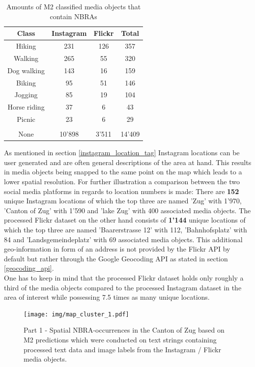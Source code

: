 \begin{table}[h!]
\begin{center}
\caption{Amounts of M2 classified media objects that contain NBRAs}\vspace{1ex}
\label{tab:amount_class_NBRAs}
\begin{tabular}{cccc}\hline
Class & Instagram & Flickr & Total\\ \hline
Hiking & 231 & 126 & 357\\
Walking & 265 & 55 & 320\\
Dog walking & 143 & 16 & 159\\
Biking & 95 & 51 & 146\\
Jogging & 85 & 19 & 104\\
Horse riding & 37 & 6 & 43\\
Picnic & 23 & 6 & 29\\
 & & & \\
None & 10'898 & 3'511 & 14'409\\
\hline
\end{tabular}
\end{center}
\end{table}

As mentioned in section \ref{instagram_location_tag} Instagram locations can be user generated and are often general descriptions of the area at hand. This results in media objects being snapped to the same point on the map which leads to a lower spatial resolution. For further illustration a comparison between the two social media platforms in regards to location numbers is made:
There are \textbf{152} unique Instagram locations of which the top three are named 'Zug' with 1'970, 'Canton of Zug' with 1'590 and 'lake Zug' with 400 associated media objects.
The processed Flickr dataset on the other hand consists of \textbf{1'144} unique locations of which the top three are named 'Baarerstrasse 12' with 112, 'Bahnhofsplatz' with 84 and 'Landsgemeindeplatz' with 69 associated media objects. This additional geo-information in form of an address is not provided by the Flickr API by default but rather through the Google Geocoding API as stated in section \ref{geocoding_api}. \\
One has to keep in mind that the processed Flickr dataset holds only roughly a third of the media objects compared to the processed Instagram dataset in the area of interest while possessing 7.5 times as many unique locations. 

\begin{figure}[h!]
   \centering
   \texttt{[image: img/map\_cluster\_1.pdf]}
   \caption{Part 1 - Spatial NBRA-occurrences in the Canton of Zug based on M2 predictions which were conducted on text strings containing processed text data and image labels from the Instagram / Flickr media objects.}
   \label{fig:map_cluster_1}
\end{figure}

